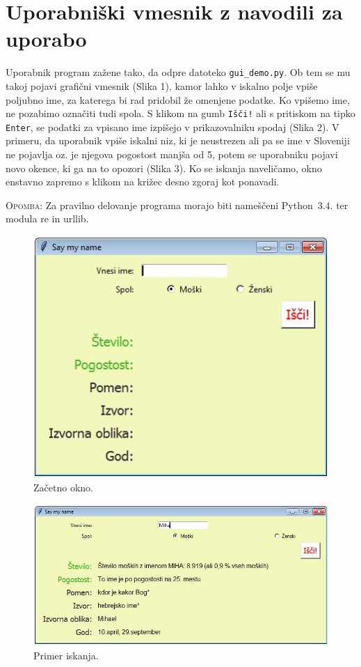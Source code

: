 \documentclass[a4paper, 12pt]{article}
\begin{document}
\section{Uporabniški vmesnik z navodili za uporabo}

Uporabnik program zažene tako, da odpre datoteko \texttt{gui\_demo.py}. Ob tem se mu takoj pojavi grafični vmesnik (Slika 1), kamor lahko v iskalno polje vpiše poljubno ime, za katerega bi rad pridobil že omenjene podatke. Ko vpišemo ime, ne pozabimo označiti tudi spola. S klikom na gumb \texttt{Išči!} ali s pritiskom na tipko \texttt{Enter}, se podatki za vpisano ime izpišejo v prikazovalniku spodaj (Slika 2). V primeru, da uporabnik vpiše iskalni niz, ki je neustrezen ali pa se ime v Sloveniji ne pojavlja oz. je njegova pogostost manjša od 5, potem se uporabniku pojavi novo okence, ki ga na to opozori (Slika 3). Ko se iskanja naveličamo, okno enstavno zapremo s klikom na križec desno zgoraj kot ponavadi.

\textsc{Opomba:} Za pravilno delovanje programa morajo biti nameščeni Python~3.4. ter modula re in urllib.

\begin{figure}[h]
\centering
\includegraphics[scale=0.8] {zacetek.jpg}
\caption{Začetno okno.}
\end{figure}

\begin{figure}[h]
\centering
\includegraphics[scale=0.6] {primer.jpg}
\caption{Primer iskanja.}
\end{figure}
\end{document}
